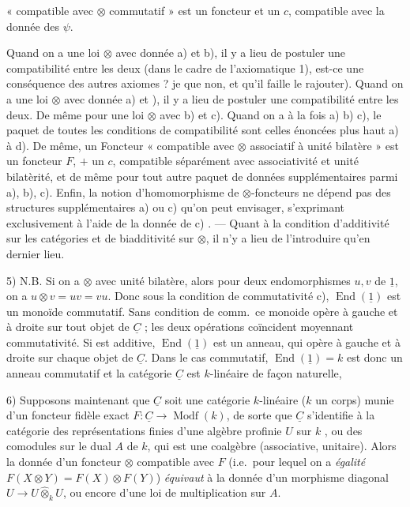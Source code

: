 \documentclass[11pt,a4paper]{article}
\begin{document}
« compatible avec $\otimes$ commutatif » est un foncteur et un $c$, compatible
avec la donnée des $\psi$.

Quand on a une loi $\otimes$ avec donnée a) et b), il y a lieu de postuler une
compatibilité entre les deux (dans le cadre de l'axiomatique 1), est-ce une
conséquence des autres axiomes ? je   que non, et
qu'il faille le rajouter). Quand on a une loi $\otimes$ avec donnée a) et
), il y a lieu de postuler une compatibilité entre les deux. De
même pour une loi $\otimes$ avec b) et c). Quand on a à la fois a) b) c), le
paquet \struck{\ill{}} de toutes les conditions de compatibilité sont celles
énoncées plus haut  a) à d). De même, un Foncteur
« compatible avec $\otimes$ associatif à unité bilatère » est un foncteur $F$,
$+$ un $c$, compatible séparément avec associativité et unité bilatèrité, et
de même pour tout autre paquet de données supplémentaires parmi a), b), c).
Enfin, la notion d'homomorphisme de \struck{\ill{}} $\otimes$-foncteurs ne
dépend pas des structures supplémentaires a)  ou c)
 qu'on peut envisager, s'exprimant exclusivement à
l'aide de la donnée de c) . --- Quant à la \struck{\ill{}} 
condition d'additivité sur les catégories et de biadditivité sur $\otimes$, il
n'y a lieu de l'introduire qu'en dernier lieu.


5) N.B. Si on a $\otimes$ avec unité bilatère, alors pour deux endomorphismes
$u, v$ de $\underline{1}$, on a $u \otimes v = uv = vu$. Donc sous la
condition de commutativité c), $\operatorname{End}(\underline{1})$ est un
monoïde commutatif. \struck{\ill{}} Sans condition de comm.\ ce monoide opère
à gauche et à droite sur tout objet de $\underline{C}$ ; les deux opérations
coïncident moyennant commutativité. Si 
 est additive, $\operatorname{End}(\underline{1})$ est un
anneau, qui opère à gauche et à droite sur chaque objet de $\underline{C}$.
Dans le cas commutatif, $\operatorname{End}(\underline{1}) = k$ est donc un
anneau commutatif et la catégorie $\underline{C}$ est $k$-linéaire de façon
naturelle, 

6) Supposons maintenant que $\underline{C}$ soit une catégorie
  $k$-linéaire ($k$ un corps) munie d'un
foncteur fidèle exact $F : \underline{C} \to \operatorname{Modf}(k)$, de sorte
que $\underline{C}$ s'identifie à la catégorie des représentations
\struck{\ill{}}  finies d'une algèbre profinie $U$ sur $k$
, ou des comodules sur le dual
 $A$ de $k$, qui est une coalgèbre (associative, unitaire).
Alors la donnée d'un foncteur $\otimes$  compatible avec $F$
(i.e.\ pour lequel \struck{\ill{}} on a \emph{égalité}
$F(X \otimes Y) = F(X) \otimes F(Y)$) \emph{équivaut} à la donnée d'un
morphisme diagonal $U \to U \mathbin{\widehat{\otimes}_{k}} U$, ou encore
d'une loi de multiplication sur $A$.
\end{document}
